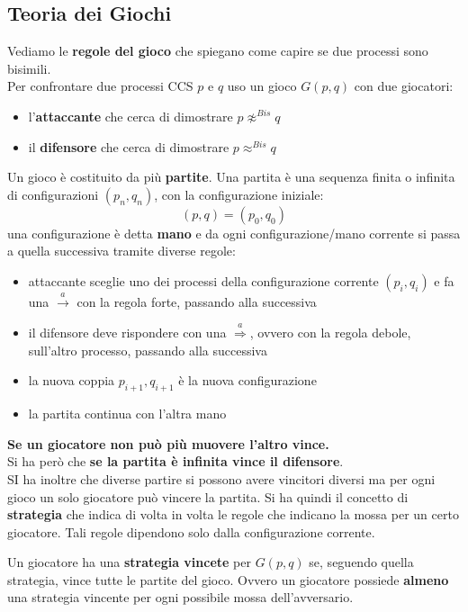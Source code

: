 \subsection{Teoria dei Giochi}
Vediamo le \textbf{regole del gioco} che spiegano come capire se due processi
sono bisimili. \\
Per confrontare due processi CCS $p$ e $q$ uso un gioco $G(p, q)$ con due
giocatori: 
\begin{itemize}
  \item l'\textbf{attaccante} che cerca di dimostrare $p\not\approx^{Bis}q$
  \item il \textbf{difensore }che cerca di dimostrare $p\approx^{Bis}q$
\end{itemize}
Un gioco è costituito da più \textbf{partite}.
Una partita è una sequenza finita o infinita di configurazioni $(p_n, q_n)$, con
la configurazione iniziale:
\[(p, q)=(p_0, q_0)\]
una configurazione è detta \textbf{mano} e da ogni configurazione/mano corrente
si passa a quella successiva tramite diverse regole:
\begin{itemize}
  \item attaccante sceglie uno dei processi della configurazione corrente
  $(p_i, q_i)$ e fa una $\stackrel{a}{\rightarrow}$ con la regola forte, passando
  alla successiva
  \item il difensore deve rispondere con una $\stackrel{a}{\Rightarrow}$, ovvero
  con la regola debole, sull'altro processo, passando alla successiva
  \item la nuova coppia $p_{i+1}, q_{i+1}$ è la nuova configurazione
  \item la partita continua con l'altra mano
\end{itemize}
\textbf{Se un giocatore non può più muovere l'altro vince.}\\
Si ha però che \textbf{se la partita è infinita vince il difensore}.\\
SI ha inoltre che diverse partire si possono avere vincitori diversi ma per ogni
gioco un solo giocatore può vincere la partita. Si ha quindi il concetto di
\textbf{strategia} che indica di volta in volta le regole che indicano la mossa
per un certo giocatore. Tali regole dipendono solo dalla configurazione
corrente.\\
\begin{definizione}
Un giocatore ha una \textbf{strategia vincete} per $G(p, q)$ se, seguendo quella
strategia, vince tutte le partite del gioco. Ovvero un giocatore possiede \textbf{almeno} una strategia vincente per ogni possibile mossa dell'avversario.
\end{definizione} \vspace{5mm} %
